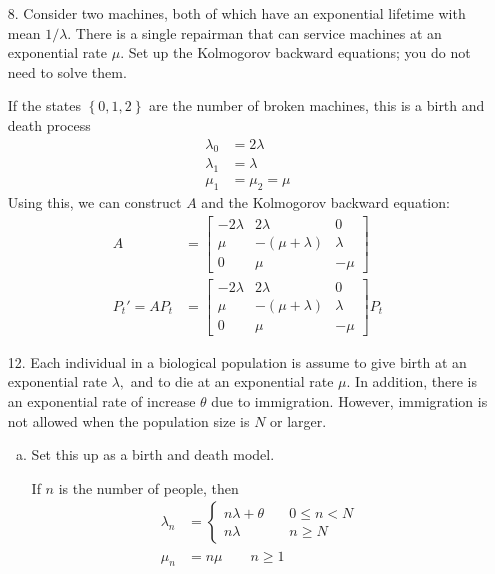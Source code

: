 \documentclass{article}
\begin{document}
\begin{itemize}
	\item[8.] Consider two machines, both of which have an exponential lifetime with mean $1/\lambda.$ There is a single repairman that can service machines at an exponential rate $\mu.$ Set up the Kolmogorov backward equations; you do not need to solve them.
		\begin{soln}
			If the states $\left\{ 0, 1, 2 \right\}$ are the number of broken machines, this is a birth and death process
			\begin{align*}
				\lambda_0 &= 2\lambda \\
				\lambda_1 &= \lambda \\
				\mu_1 &= \mu_2 = \mu
			\end{align*}
			Using this, we can construct $A$ and the Kolmogorov backward equation:
			\begin{align*}
				A &= \begin{bmatrix}
					-2\lambda & 2\lambda & 0 \\
					\mu & -(\mu+\lambda) & \lambda \\
					0 & \mu & -\mu
				\end{bmatrix} \\
				P_t' = AP_t &= \begin{bmatrix}
					-2\lambda & 2\lambda & 0 \\
					\mu & -(\mu+\lambda) & \lambda \\
					0 & \mu & -\mu
				\end{bmatrix} P_t
			\end{align*}
		\end{soln}

	\item[12.]Each individual in a biological population is assume to give birth at an exponential rate $\lambda,$ and to die at an exponential rate $\mu.$ In addition, there is an exponential rate of increase $\theta$ due to immigration. However, immigration is not allowed when the population size is $N$ or larger.
		\begin{enumerate}[(a)]
			\item Set this up as a birth and death model.
				\begin{soln}
					If $n$ is the number of people, then
					\begin{align*}
						\lambda_n &= \begin{cases}
							n\lambda + \theta &\quad 0\le n<N \\
							n\lambda &\quad n\ge N
						\end{cases} \\
						\mu_n &= n\mu \quad\quad n\ge 1
					\end{align*}
				\end{soln}


\end{enumerate}
\end{itemize}
\end{document}
